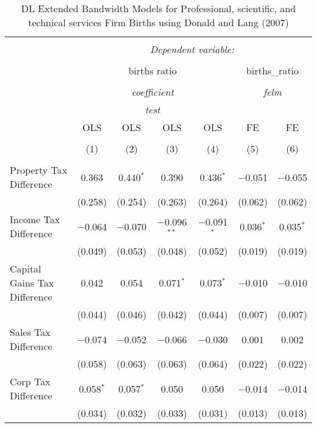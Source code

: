 
\begin{table}[!htbp] \centering 
  \caption{DL Extended Bandwidth Models for  Professional, scientific, and technical services Firm Births using Donald and Lang (2007)} 
  \label{} 
\begin{tabular}{@{\extracolsep{5pt}}lcccccc} 
\\[-1.8ex]\hline 
\hline \\[-1.8ex] 
 & \multicolumn{6}{c}{\textit{Dependent variable:}} \\ 
\cline{2-7} 
\\[-1.8ex] & \multicolumn{4}{c}{births ratio} & \multicolumn{2}{c}{births\_ratio} \\ 
\\[-1.8ex] & \multicolumn{4}{c}{\textit{coefficient}} & \multicolumn{2}{c}{\textit{felm}} \\ 
 & \multicolumn{4}{c}{\textit{test}} & \multicolumn{2}{c}{\textit{}} \\ 
 & OLS & OLS & OLS & OLS & FE & FE \\ 
\\[-1.8ex] & (1) & (2) & (3) & (4) & (5) & (6)\\ 
\hline \\[-1.8ex] 
 Property Tax Difference & 0.363 & 0.440$^{*}$ & 0.390 & 0.436$^{*}$ & $-$0.051 & $-$0.055 \\ 
  & (0.258) & (0.254) & (0.263) & (0.264) & (0.062) & (0.062) \\ 
  Income Tax Difference & $-$0.064 & $-$0.070 & $-$0.096$^{**}$ & $-$0.091$^{*}$ & 0.036$^{*}$ & 0.035$^{*}$ \\ 
  & (0.049) & (0.053) & (0.048) & (0.052) & (0.019) & (0.019) \\ 
  Capital Gains Tax Difference & 0.042 & 0.054 & 0.071$^{*}$ & 0.073$^{*}$ & $-$0.010 & $-$0.010 \\ 
  & (0.044) & (0.046) & (0.042) & (0.044) & (0.007) & (0.007) \\ 
  Sales Tax Difference & $-$0.074 & $-$0.052 & $-$0.066 & $-$0.030 & 0.001 & 0.002 \\ 
  & (0.058) & (0.063) & (0.063) & (0.064) & (0.022) & (0.022) \\ 
  Corp Tax Difference & 0.058$^{*}$ & 0.057$^{*}$ & 0.050 & 0.050 & $-$0.014 & $-$0.014 \\ 
  & (0.034) & (0.032) & (0.033) & (0.031) & (0.013) & (0.013) \\ 

\end{tabular}
\end{table}
